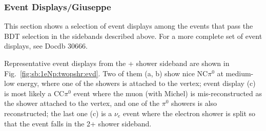 \subsubsection{Event Displays/Giuseppe}

This section shows a selection of event displays among the events that pass the BDT selection in the \npsel sidebands described above. For a more complete set of event displays, see Docdb 30666. 

Representative event displays from the + shower sideband are shown in Fig.~\ref{fig:sb:1eNp:twopshr:evd}. Two of them (a, b) show nice NC$\pi^0$ at medium-low energy, where one of the showers is attached to the vertex; event display (c) is most likely a CC$\pi^0$ event where the muon (with Michel) is mis-reconstructed as the shower attached to the vertex, and one of the $\pi^0$ showers is also reconstructed; the last one (c) is a $\nu_e$ event where the electron shower is split so that the event falls in the 2+ shower sideband.


